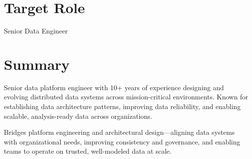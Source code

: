 \section*{Target Role}
\begin{center}
	\vspace{-0.4em}
	Senior Data Engineer
\end{center}
\vspace{-1em}


\section*{Summary}
\vspace{-0.3em}

Senior data platform engineer with 10+ years of experience designing and evolving distributed data systems across mission-critical environments. Known for establishing data architecture patterns, improving data reliability, and enabling scalable, analysis-ready data across organizations.

Bridges platform engineering and architectural design—aligning data systems with organizational needs, improving consistency and governance, and enabling teams to operate on trusted, well-modeled data at scale.

